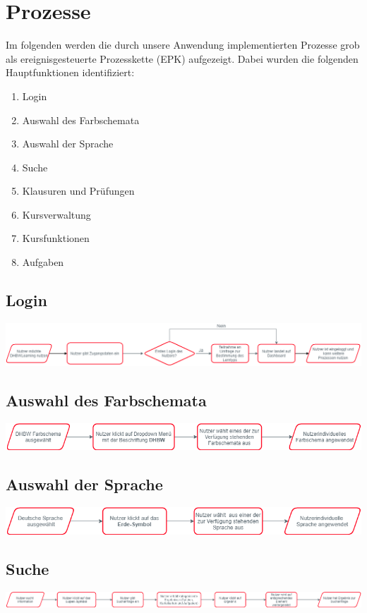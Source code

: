 
\chapter{Prozesse}
Im folgenden werden die durch unsere Anwendung implementierten Prozesse grob als ereignisgesteuerte Prozesskette (EPK) aufgezeigt. Dabei wurden die folgenden Hauptfunktionen identifiziert:
\begin{enumerate}
	\item Login
	\item Auswahl des Farbschemata
	\item Auswahl der Sprache
	\item Suche
	\item Klausuren und Prüfungen
	\item Kursverwaltung
	\item Kursfunktionen
	\item Aufgaben
\end{enumerate}

\section{Login}
	\includegraphics[width=\linewidth, keepaspectratio]{img/Prozesse/login}
\section{Auswahl des Farbschemata}
	\includegraphics[width=\linewidth, keepaspectratio]{img/Prozesse/color}
\section{Auswahl der Sprache}
	\includegraphics[width=\linewidth, keepaspectratio]{img/Prozesse/language}
\section{Suche}
	\includegraphics[width=\linewidth, keepaspectratio]{img/Prozesse/search}
